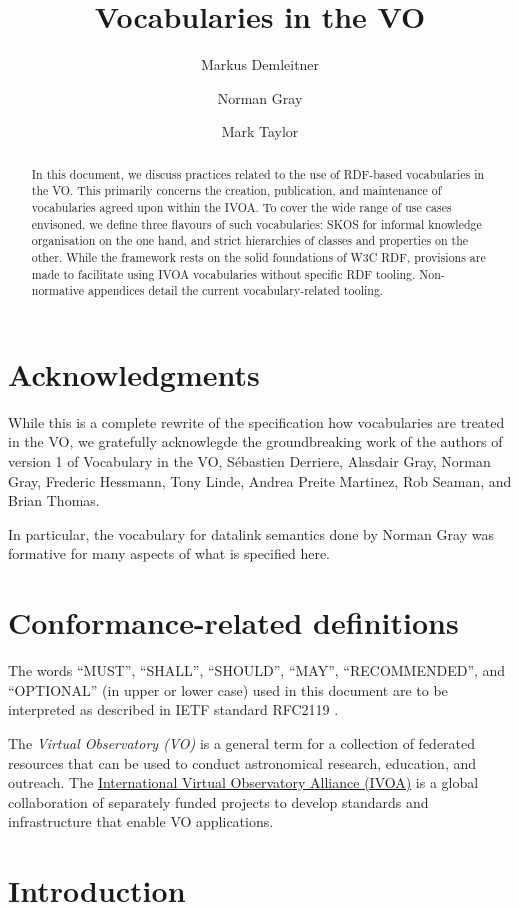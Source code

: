 \documentclass[11pt,a4paper]{ivoa}
\title{Vocabularies in the VO}
\author[https://wiki.ivoa.net/twiki/bin/view/IVOA/MarkusDemleitner]{Markus
Demleitner}
\author[https://wiki.ivoa.net/twiki/bin/view/IVOA/NormanGray]{Norman
Gray}
\author[https://wiki.ivoa.net/twiki/bin/view/IVOA/MarkTaylor]{Mark
Taylor}
\begin{document}
\begin{abstract}
In this document, we discuss practices related to the use of RDF-based
vocabularies in the VO.  This primarily concerns the creation,
publication, and maintenance of vocabularies agreed upon within the IVOA.
To cover the wide range of use cases envisoned, we define three flavours
of such vocabularies: SKOS for informal knowledge organisation on the
one hand, and strict hierarchies of classes and properties on the other.
While the framework rests on the solid foundations of W3C RDF,
provisions are made to facilitate using IVOA vocabularies without
specific RDF tooling.
Non-normative appendices detail the current vocabulary-related tooling.
\end{abstract}


\section*{Acknowledgments}

While this is a complete rewrite of the specification how vocabularies
are treated in the VO, we gratefully acknowlegde the groundbreaking work
of the authors of version 1 of Vocabulary in the VO, S\'ebastien
Derriere, Alasdair Gray, Norman Gray, Frederic Hessmann, Tony Linde,
Andrea Preite Martinez, Rob Seaman, and Brian Thomas.

In particular, the vocabulary for datalink semantics done by Norman Gray
was formative for many aspects of what is specified here.

\section*{Conformance-related definitions}

The words ``MUST'', ``SHALL'', ``SHOULD'', ``MAY'', ``RECOMMENDED'', and
``OPTIONAL'' (in upper or lower case) used in this document are to be
interpreted as described in IETF standard RFC2119 \citep{std:RFC2119}.

The \emph{Virtual Observatory (VO)} is a
general term for a collection of federated resources that can be used
to conduct astronomical research, education, and outreach.
The \href{http://www.ivoa.net}{International
Virtual Observatory Alliance (IVOA)} is a global
collaboration of separately funded projects to develop standards and
infrastructure that enable VO applications.

\section{Introduction}
\end{document}
